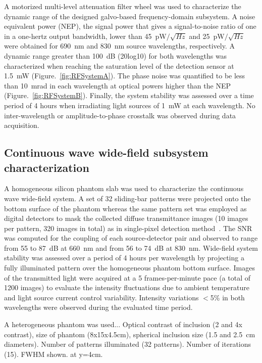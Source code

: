 A motorized multi-level attenuation filter wheel was used to characterize the dynamic range of the designed galvo-based frequency-domain subsystem. A noise equivalent power (NEP), the signal power that gives a signal-to-noise ratio of one in a one-hertz output bandwidth, lower than 45~pW$/\sqrt{Hz}$ and 25~pW$/\sqrt{Hz}$ were obtained for 690~nm and 830~nm source wavelengths, respectively. A dynamic range greater than 100~dB (20log10) for both wavelengths was characterized when reaching the saturation level of the detection sensor at 1.5~mW (Figure.~\ref{fig:RFSystemA}). The phase noise was quantified to be less than 10~mrad in each wavelength at optical powers higher than the NEP (Figure.~\ref{fig:RFSystemB}). Finally, the system stability was assessed over a time period of 4 hours when irradiating light sources of 1~mW at each wavelength. No inter-wavelength or amplitude-to-phase crosstalk was observed during data acquisition.


\subsection{Continuous wave wide-field subsystem characterization}
A homogeneous silicon phantom slab was used to characterize the continuous wave wide-field system. A set of 32 sliding-bar patterns were projected onto the bottom surface of the phantom whereas the same pattern set was employed as digital detectors to mask the collected diffuse transmittance images (10 images per pattern, 320 images in total) as in single-pixel detection method~\cite{Pian2015}. The SNR was computed for the coupling of each source-detector pair and observed to range from 55 to 87~dB at 660~nm and from 56 to 74~dB at 830~nm. Wide-field system stability was assessed over a period of 4 hours per wavelength by projecting a fully illuminated pattern over the homogeneous phantom bottom surface. Images of the transmitted light were acquired at a 5 frames-per-minute pace (a total of 1200 images) to evaluate the intensity fluctuations due to ambient temperature and light source current control variability. Intensity variations $<$5\% in both wavelengths were observed during the evaluated time period.

A heterogeneous phantom was used...
Optical contrast of inclusion (2 and 4x contrast), size of phantom (8x15x4.5cm), spherical inclusion size (1.5 and 2.5~cm diameters).
Number of patterns illuminated (32 patterns). 
Number of iterations (15).
FWHM shown. at y=4cm.

